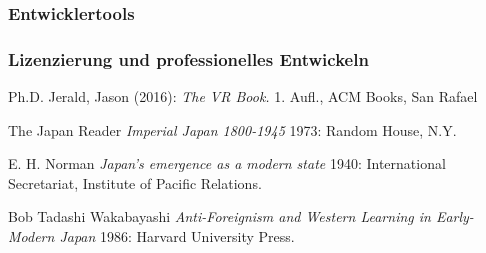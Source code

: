 \documentclass[a4paper,12pt]{scrartcl}
\begin{document}
\subsubsection{Entwicklertools}
\subsubsection{Lizenzierung und professionelles Entwickeln}

\begin{thebibliography}{1}
	
	 Ph.D. Jerald, Jason (2016): {\em The VR Book.} 1. Aufl., ACM Books, San Rafael
	
	  The Japan Reader {\em Imperial Japan 1800-1945} 1973:
	Random House, N.Y.
	
	 E. H. Norman {\em Japan's emergence as a modern
		state} 1940: International Secretariat, Institute of Pacific
	Relations.
	
	 Bob Tadashi Wakabayashi {\em Anti-Foreignism and Western
		Learning in Early-Modern Japan} 1986: Harvard University Press.
	
\end{thebibliography}
\end{document}
